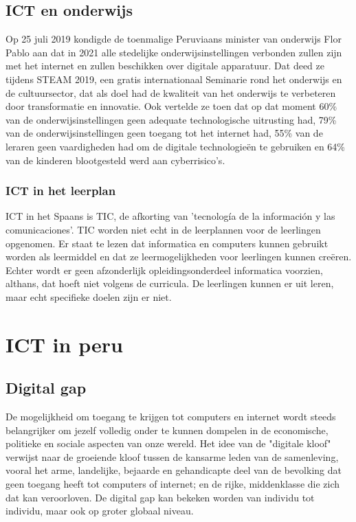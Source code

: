 
\subsection{ICT en onderwijs}
Op 25 juli 2019 kondigde de toenmalige Peruviaans minister van onderwijs Flor Pablo aan dat in 2021 alle stedelijke onderwijsinstellingen verbonden zullen zijn met het internet en zullen beschikken over digitale apparatuur. Dat deed ze tijdens STEAM 2019, een gratis internationaal Seminarie rond het onderwijs en de cultuursector, dat als doel had de kwaliteit van het onderwijs te verbeteren door transformatie en innovatie. Ook vertelde ze toen dat op dat moment 60\% van de onderwijsinstellingen geen adequate technologische uitrusting had, 79\% van de onderwijsinstellingen geen toegang tot het internet had, 55\% van de leraren geen vaardigheden had om de digitale technologieën te gebruiken en 64\% van de kinderen blootgesteld werd aan cyberrisico's. \autocite{Educacion2019}

\subsubsection{ICT in het leerplan}
ICT in het Spaans is TIC, de afkorting van 'tecnología de la información y las comunicaciones'. TIC worden niet echt in de leerplannen voor de leerlingen opgenomen. Er staat te lezen dat informatica en computers kunnen gebruikt worden als leermiddel en dat ze leermogelijkheden voor leerlingen kunnen creëren. Echter wordt er geen afzonderlijk opleidingsonderdeel informatica voorzien, althans, dat hoeft niet volgens de curricula. De leerlingen kunnen er uit leren, maar echt specifieke doelen zijn er niet. \autocite{MINEDU2016}

\section{ICT in peru}
\subsection{Digital gap}
De mogelijkheid om toegang te krijgen tot computers en internet wordt steeds belangrijker om jezelf volledig onder te kunnen dompelen in de economische, politieke en sociale aspecten van onze wereld. Het idee van de "digitale kloof" verwijst naar de groeiende kloof tussen de kansarme leden van de samenleving, vooral het arme, landelijke, bejaarde en gehandicapte deel van de bevolking dat geen toegang heeft tot computers of internet; en de rijke, middenklasse die  zich dat kan veroorloven. De digital gap kan bekeken worden van individu tot individu, maar ook op groter globaal niveau. \autocite{Marichick2000}

